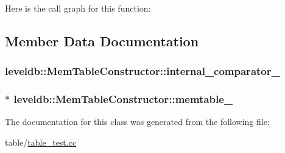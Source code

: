 Here is the call graph for this function\-:




\subsection{Member Data Documentation}
\hypertarget{classleveldb_1_1_mem_table_constructor_a77fb87fcc606b862e0aa997d97dd8275}{
\subsubsection[{internal\-\_\-comparator\-\_\-}]{ leveldb\-::\-Mem\-Table\-Constructor\-::internal\-\_\-comparator\-\_\-\hspace{0.3cm}{\ttfamily [private]}}}\label{classleveldb_1_1_mem_table_constructor_a77fb87fcc606b862e0aa997d97dd8275}
\hypertarget{classleveldb_1_1_mem_table_constructor_aee8e2d856ed9333890cce216b425edb8}{
\subsubsection[{memtable\-\_\-}]{$\ast$ leveldb\-::\-Mem\-Table\-Constructor\-::memtable\-\_\-\hspace{0.3cm}{\ttfamily [private]}}}\label{classleveldb_1_1_mem_table_constructor_aee8e2d856ed9333890cce216b425edb8}


The documentation for this class was generated from the following file\-:\begin{DoxyCompactItemize}
\item 
table/\hyperlink{table__test_8cc}{table\-\_\-test.\-cc}\end{DoxyCompactItemize}
